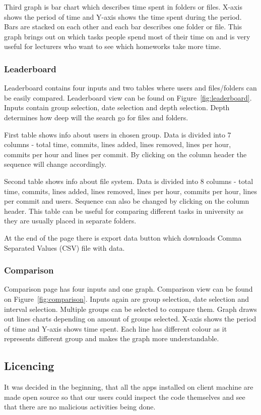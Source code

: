 Third graph is bar chart which describes time spent in folders or files.
X-axis shows the period of time and Y-axis shows the time spent during the period.
Bars are stacked on each other and each bar describes one folder or file.
This graph brings out on which tasks people spend most of their time on and is very useful for lecturers who want to see which homeworks take more time.

\subsubsection{Leaderboard}\label{subsubsec:leaderboard}
Leaderboard contains four inputs and two tables where users and files/folders can be easily compared.
Leaderboard view can be found on Figure~\ref{fig:leaderboard}.
Inputs contain group selection, date selection and depth selection.
Depth determines how deep will the search go for files and folders.

First table shows info about users in chosen group.
Data is divided into 7 columns - total time, commits, lines added, lines removed, lines per hour, commits per hour and lines per commit.
By clicking on the column header the sequence will change accordingly.

Second table shows info about file system.
Data is divided into 8 columns - total time, commits, lines added, lines removed, lines per hour, commits per hour, lines per commit and users.
Sequence can also be changed by clicking on the column header.
This table can be useful for comparing different tasks in university as they are usually placed in separate folders.

At the end of the page there is export data button which downloads Comma Separated Values (CSV) file with data.

\subsubsection{Comparison}\label{subsubsec:comparison}
Comparison page has four inputs and one graph.
Comparison view can be found on Figure~\ref{fig:comparison}.
Inputs again are group selection, date selection and interval selection.
Multiple groups can be selected to compare them.
Graph draws out lines charts depending on amount of groups selected.
X-axis shows the period of time and Y-axis shows time spent.
Each line has different colour as it represents different group and makes the graph more understandable.

\subsection{Licencing}\label{subsec:licencing}
It was decided in the beginning, that all the apps installed on client machine are made open source so that
our users could inspect the code themselves and see that there are no malicious activities being done.

